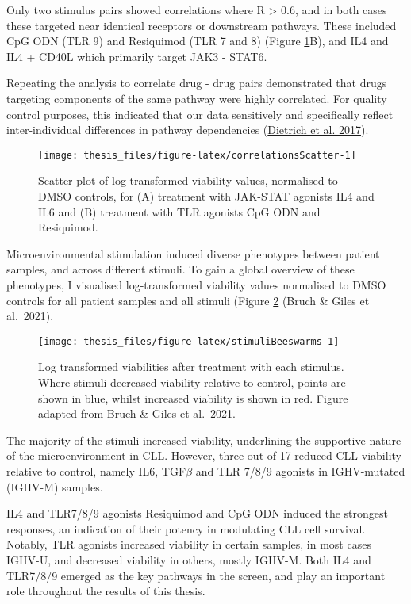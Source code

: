 \documentclass[11pt, a4paper, twosided]{book}
\begin{document}
Only two stimulus pairs showed correlations where R \textgreater{} 0.6, and in both cases these targeted near identical receptors or downstream pathways. These included CpG ODN (TLR 9) and Resiquimod (TLR 7 and 8) (Figure \ref{fig:correlationsScatter}B), and IL4 and IL4 + CD40L which primarily target JAK3 - STAT6.

Repeating the analysis to correlate drug - drug pairs demonstrated that drugs targeting components of the same pathway were highly correlated. For quality control purposes, this indicated that our data sensitively and specifically reflect inter-individual differences in pathway dependencies (\protect\hyperlink{ref-JCIpaper}{Dietrich et al. 2017}).


\begin{figure}

{\centering \texttt{[image: thesis\_files/figure-latex/correlationsScatter-1]} 

}

\caption{Scatter plot of log-transformed viability values, normalised to DMSO controls, for (A) treatment with JAK-STAT agonists IL4 and IL6 and (B) treatment with TLR agonists CpG ODN and Resiquimod.}\label{fig:correlationsScatter}
\end{figure}
Microenvironmental stimulation induced diverse phenotypes between patient samples, and across different stimuli. To gain a global overview of these phenotypes, I visualised log-transformed viability values normalised to DMSO controls for all patient samples and all stimuli (Figure \ref{fig:stimuliBeeswarms} (Bruch \& Giles et al.~2021).


\begin{figure}

{\centering \texttt{[image: thesis\_files/figure-latex/stimuliBeeswarms-1]} 

}

\caption{Log transformed viabilities after treatment with each stimulus. Where stimuli decreased viability relative to control, points are shown in blue, whilst increased viability is shown in red. Figure adapted from Bruch \& Giles et al.~2021.}\label{fig:stimuliBeeswarms}
\end{figure}
The majority of the stimuli increased viability, underlining the supportive nature of the microenvironment in CLL. However, three out of 17 reduced CLL viability relative to control, namely IL6, TGF\(\beta\) and TLR 7/8/9 agonists in IGHV-mutated (IGHV-M) samples.

IL4 and TLR7/8/9 agonists Resiquimod and CpG ODN induced the strongest responses, an indication of their potency in modulating CLL cell survival. Notably, TLR agonists increased viability in certain samples, in most cases IGHV-U, and decreased viability in others, mostly IGHV-M. Both IL4 and TLR7/8/9 emerged as the key pathways in the screen, and play an important role throughout the results of this thesis.
\end{document}
